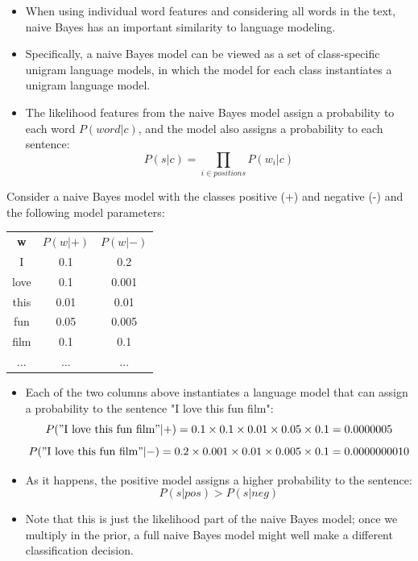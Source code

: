 \begin{itemize}
 \item When using individual word features and considering all words in the text, naive Bayes has an important similarity to language modeling. 
 \item Specifically, a naive Bayes model can be viewed as a set of class-specific unigram language models, in which the model for each class instantiates a unigram language model.
 \item The likelihood features from the naive Bayes model assign a probability to each word $P(word|c)$, and the model also assigns a probability to each sentence:
\[P(s|c) = \prod_{i\in positions} P(w_i|c)\]
\end{itemize}
Consider a naive Bayes model with the classes positive (+) and negative (-) and the following model parameters:
\begin{center}
\begin{tabular}{ccc}
\textbf{w} & $P(w|+)$ & $P(w|-)$ \\
I & 0.1 & 0.2 \\
love & 0.1 & 0.001 \\
this & 0.01 & 0.01 \\
fun & 0.05 & 0.005 \\
film & 0.1 & 0.1 \\
... & ... & ...
\end{tabular}
\end{center}



\begin{itemize}
 \item  Each of the two columns above instantiates a language model that can assign a probability to the sentence "I love this fun film":
\[P("\text{I love this fun film}"|+) = 0.1 \times 0.1 \times 0.01 \times 0.05 \times 0.1 = 0.0000005\]
\[P("\text{I love this fun film}"|-) = 0.2 \times 0.001 \times 0.01 \times 0.005 \times 0.1 = 0.0000000010\]

\item As it happens, the positive model assigns a higher probability to the sentence:
\[P(s|pos) > P(s|neg)\]

\item Note that this is just the likelihood part of the naive Bayes model; once we multiply in the prior, a full naive Bayes model might well make a different classification decision.
\end{itemize}




